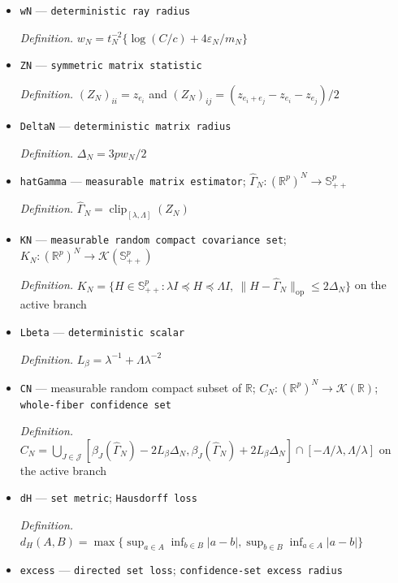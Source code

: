 \documentclass{article}
\begin{document}
\begin{itemize}
  \par\smallskip\noindent\emph{Definition.} \(z_u=-2t_N^{-2}\{\log(\max(|\widehat\phi_N(t_Nu)|,m_N/2))+q_u\log(1+t_N)-(\log c+\log C)/2\}\)
  \item \texttt{wN} --- \texttt{deterministic ray radius}
  \par\smallskip\noindent\emph{Definition.} \(w_N=t_N^{-2}\{\log(C/c)+4\varepsilon_N/m_N\}\)
  \item \texttt{ZN} --- \texttt{symmetric matrix statistic}
  \par\smallskip\noindent\emph{Definition.} \((Z_N)_{ii}=z_{e_i}\) and \((Z_N)_{ij}=(z_{e_i+e_j}-z_{e_i}-z_{e_j})/2\)
  \item \texttt{DeltaN} --- \texttt{deterministic matrix radius}
  \par\smallskip\noindent\emph{Definition.} \(\Delta_N=3pw_N/2\)
  \item \texttt{hatGamma} --- \texttt{measurable matrix estimator}; \(\widehat\Gamma_N:(\mathbb R^p)^N\to\mathbb S_{++}^p\)
  \par\smallskip\noindent\emph{Definition.} \(\widehat\Gamma_N=\operatorname{clip}_{[\lambda,\Lambda]}(Z_N)\)
  \item \texttt{KN} --- \texttt{measurable random compact covariance set}; \(K_N:(\mathbb R^p)^N\to\mathcal K(\mathbb S_{++}^p)\)
  \par\smallskip\noindent\emph{Definition.} \(K_N=\{H\in\mathbb S_{++}^p:\lambda I\preceq H\preceq\Lambda I,\ \|H-\widehat\Gamma_N\|_{\mathrm{op}}\le2\Delta_N\}\) on the active branch
  \item \texttt{Lbeta} --- \texttt{deterministic scalar}
  \par\smallskip\noindent\emph{Definition.} \(L_\beta=\lambda^{-1}+\Lambda\lambda^{-2}\)
  \item \texttt{CN} --- measurable random compact subset of \(\mathbb R\); \(C_N:(\mathbb R^p)^N\to\mathcal K(\mathbb R)\); \texttt{whole-\allowbreak{}fiber confidence set}
  \par\smallskip\noindent\emph{Definition.} \(C_N=\bigcup_{J\in\mathcal J}[\beta_J(\widehat\Gamma_N)-2L_\beta\Delta_N,\beta_J(\widehat\Gamma_N)+2L_\beta\Delta_N]\cap[-\Lambda/\lambda,\Lambda/\lambda]\) on the active branch
  \item \texttt{dH} --- \texttt{set metric}; \texttt{Hausdorff loss}
  \par\smallskip\noindent\emph{Definition.} \(d_H(A,B)=\max\{\sup_{a\in A}\inf_{b\in B}|a-b|,\sup_{b\in B}\inf_{a\in A}|a-b|\}\)
  \item \texttt{excess} --- \texttt{directed set loss}; \texttt{confidence-\allowbreak{}set excess radius}

\end{itemize}
\end{document}
